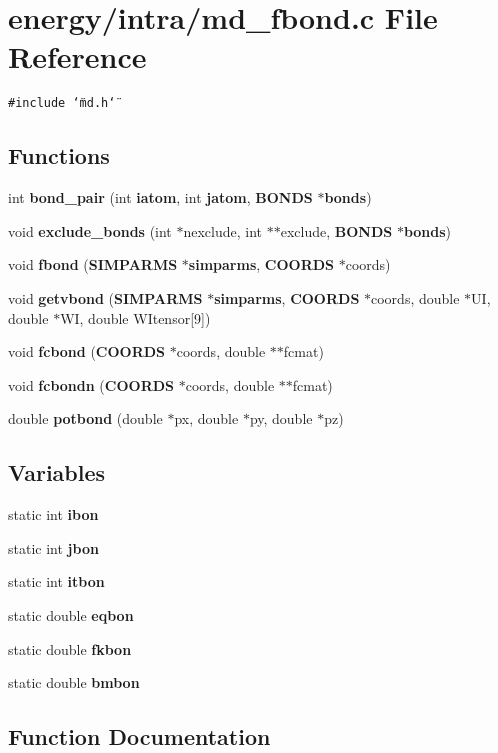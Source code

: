 \section{energy/intra/md\_\-fbond.c File Reference}
\label{md__fbond_8c}
{\tt \#include \char`\"{}md.h\char`\"{}}\par
\subsection*{Functions}
\begin{CompactItemize}
\item 
int {\bf bond\_\-pair} (int {\bf iatom}, int {\bf jatom}, {\bf BONDS} $\ast${\bf bonds})
\item 
void {\bf exclude\_\-bonds} (int $\ast$nexclude, int $\ast$$\ast$exclude, {\bf BONDS} $\ast${\bf bonds})
\item 
void {\bf fbond} ({\bf SIMPARMS} $\ast${\bf simparms}, {\bf COORDS} $\ast$coords)
\item 
void {\bf getvbond} ({\bf SIMPARMS} $\ast${\bf simparms}, {\bf COORDS} $\ast$coords, double $\ast$UI, double $\ast$WI, double WItensor[9])
\item 
void {\bf fcbond} ({\bf COORDS} $\ast$coords, double $\ast$$\ast$fcmat)
\item 
void {\bf fcbondn} ({\bf COORDS} $\ast$coords, double $\ast$$\ast$fcmat)
\item 
double {\bf potbond} (double $\ast$px, double $\ast$py, double $\ast$pz)
\end{CompactItemize}
\subsection*{Variables}
\begin{CompactItemize}
\item 
static int {\bf ibon}
\item 
static int {\bf jbon}
\item 
static int {\bf itbon}
\item 
static double {\bf eqbon}
\item 
static double {\bf fkbon}
\item 
static double {\bf bmbon}
\end{CompactItemize}


\subsection{Function Documentation}
